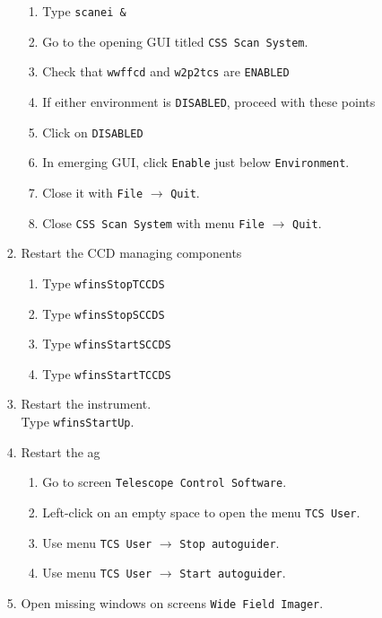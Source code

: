 \documentclass[11pt,fleqn]{book} %
\begin{document}
\begin{enumerate}
\begin{enumerate}
\begin{enumerate}
\begin{enumerate}
               \item Type \texttt{scanei \&} 
               \item Go to the opening GUI titled \texttt{CSS Scan System}.
               \item Check that \texttt{wwffcd} and \texttt{w2p2tcs} are \texttt{ENABLED}
               \item If either environment is \texttt{DISABLED}, proceed with these points
               \item Click on \texttt{DISABLED}
               \item In emerging GUI, click \texttt{Enable} just below \texttt{Environment}.
               \item Close it with \texttt{File} $\rightarrow$ \texttt{Quit}.
               \item Close \texttt{CSS Scan System} with menu \texttt{File} $\rightarrow$ \texttt{Quit}.
            \end{enumerate} 
          \item Restart the CCD managing components
             \begin{enumerate} 
               \item Type \texttt{wfinsStopTCCDS}
               \item Type \texttt{wfinsStopSCCDS}
               \item Type \texttt{wfinsStartSCCDS}
               \item Type \texttt{wfinsStartTCCDS}
             \end{enumerate}
          \item Restart the instrument.\\
                Type \texttt{wfinsStartUp}.
          \item Restart the \gls{ag}
             \begin{enumerate}
                \item Go to screen \texttt{Telescope Control Software}. 
                \item Left-click on an empty space to open the menu \texttt{TCS User}.
                \item Use menu \texttt{TCS User} $\rightarrow$ \texttt{Stop autoguider}.
                \item Use menu \texttt{TCS User} $\rightarrow$ \texttt{Start autoguider}.
             \end{enumerate}
          \item Open missing windows on screens \texttt{Wide Field Imager}.

\end{enumerate}
\end{enumerate}
\end{enumerate}
\end{document}
